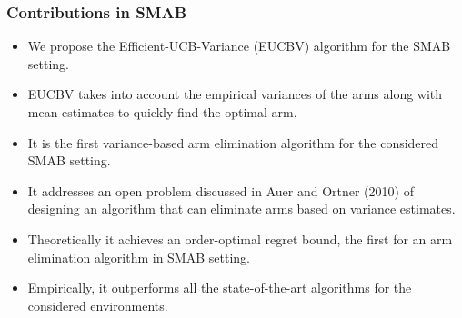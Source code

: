 \begin{frame}
\frametitle{Contributions in SMAB}
\begin{itemize}
\item<1-> We propose the Efficient-UCB-Variance (EUCBV) algorithm for the SMAB setting.
\item<2-> EUCBV takes into account the empirical variances of the arms along with mean estimates to quickly find the optimal arm.
\item<3-> It is the first variance-based arm elimination algorithm for the considered SMAB setting. 
\item<4-> It addresses an open problem discussed in {Auer and Ortner (2010)} of designing an algorithm that can eliminate arms based on variance estimates.
\item<5-> Theoretically it achieves an order-optimal regret bound, the first for an arm elimination algorithm in SMAB setting.
\item<6-> Empirically, it outperforms all the state-of-the-art algorithms for the considered environments.
\end{itemize}
\end{frame}
